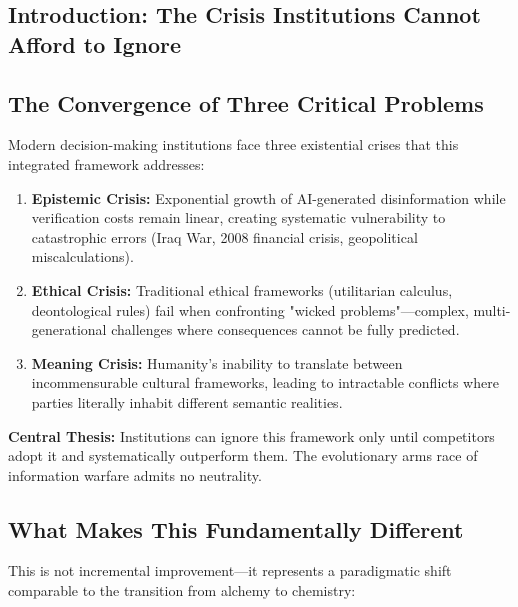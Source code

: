 \documentclass[11pt,a4paper]{article}
\theoremstyle{definition}
\theoremstyle{remark}
\begin{document}
\begin{small}
\section{Introduction: The Crisis Institutions Cannot Afford to Ignore}

\subsection{The Convergence of Three Critical Problems}

Modern decision-making institutions face three existential crises that this integrated framework addresses:

\begin{enumerate}[label=\textbf{\arabic*.},leftmargin=*]
\item \textbf{Epistemic Crisis:} Exponential growth of AI-generated disinformation while verification costs remain linear, creating systematic vulnerability to catastrophic errors (Iraq War, 2008 financial crisis, geopolitical miscalculations).

\item \textbf{Ethical Crisis:} Traditional ethical frameworks (utilitarian calculus, deontological rules) fail when confronting "wicked problems"—complex, multi-generational challenges where consequences cannot be fully predicted.

\item \textbf{Meaning Crisis:} Humanity's inability to translate between incommensurable cultural frameworks, leading to intractable conflicts where parties literally inhabit different semantic realities.
\end{enumerate}

\begin{mdframed}[backgroundcolor=red!5]
\textbf{Central Thesis:} Institutions can ignore this framework only until competitors adopt it and systematically outperform them. The evolutionary arms race of information warfare admits no neutrality.
\end{mdframed}

\subsection{What Makes This Fundamentally Different}

This is not incremental improvement—it represents a paradigmatic shift comparable to the transition from alchemy to chemistry:


\end{small}
\end{document}
